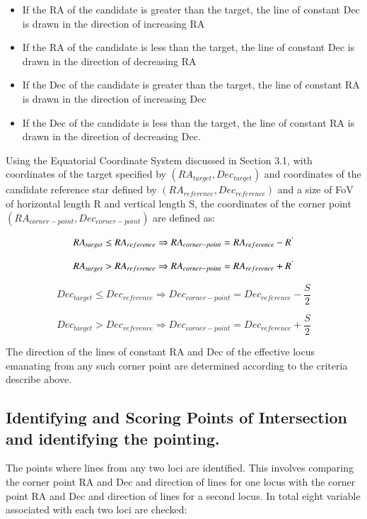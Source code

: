 \documentclass[]{elsarticle} %
\providecommand{\tightlist}{%
  \setlength{\itemsep}{0pt}\setlength{\parskip}{0pt}}
\begin{document}
\begin{itemize}
\tightlist
\item
  If the RA of the candidate is greater than the target, the line of
  constant Dec is drawn in the direction of increasing RA
\item
  If the RA of the candidate is less than the target, the line of
  constant Dec is drawn in the direction of decreasing RA
\item
  If the Dec of the candidate is greater than the target, the line of
  constant RA is drawn in the direction of increasing Dec
\item
  If the Dec of the candidate is less than the target, the line of
  constant RA is drawn in the direction of decreasing Dec.
\end{itemize}

Using the Equatorial Coordinate System discussed in Section 3.1, with
coordinates of the target specified by \((RA_{target}, Dec_{target})\)
and coordinates of the candidate reference star defined by
\((RA_{reference}, Dec_{reference})\) and a size of FoV of horizontal
length R and vertical length S, the coordinates of the corner point
\((RA_{corner-point}, Dec_{corner-point})\) are defined as:

\[RA_{target} \leq RA_{reference} \Rightarrow RA_{corner-point} = RA_{reference}- R^` \]

\[RA_{target} > RA_{reference} \Rightarrow RA_{corner-point} = RA_{reference}+ R^` \]

\[Dec_{target} \leq Dec_{reference} \Rightarrow Dec_{corner-point} = Dec_{reference}- {\frac{S}{2}} \]

\[Dec_{target} > Dec_{reference} \Rightarrow Dec_{corner-point} = Dec_{reference} + {\frac{S}{2}}\]

The direction of the lines of constant RA and Dec of the effective locus
emanating from any such corner point are determined according to the
criteria describe above.

\hypertarget{identifying-and-scoring-points-of-intersection-and-identifying-the-pointing.}{%
\subsection{Identifying and Scoring Points of Intersection and
identifying the
pointing.}\label{identifying-and-scoring-points-of-intersection-and-identifying-the-pointing.}}

The points where lines from any two loci are identified. This involves
comparing the corner point RA and Dec and direction of lines for one
locus with the corner point RA and Dec and direction of lines for a
second locus. In total eight variable associated with each two loci are
checked:
\end{document}
